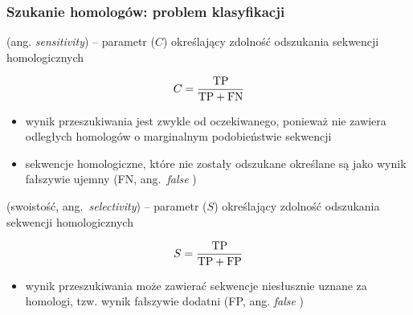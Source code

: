 \begin{frame}
\frametitle{Szukanie homologów: problem klasyfikacji}

\raggedright\tiny
\begin{multicols}{2}

  (ang. \emph{sensitivity}) -- parametr ($C$) określający
 zdolność odszukania  sekwencji homologicznych

\vspace{-2ex}

\[ C = \frac{\rm{TP}}{\rm{TP} + \rm{FN}} \]

 \begin{itemize}

 \item wynik przeszukiwania jest zwykle  od
 oczekiwanego, ponieważ nie zawiera odległych homologów o marginalnym
 podobieństwie sekwencji

 \item sekwencje homologiczne, które nie zostały odszukane określane
 są jako wynik fałszywie ujemny (FN, ang.\ \emph{false
 }) 

 \end{itemize}

  (swoistość, ang.\ \emph{selectivity}) -- parametr
 ($S$) określający zdolność odszukania  sekwencji
 homologicznych

\vspace{-2ex}

\[ S = \frac{\rm{TP}}{\rm{TP} + \rm{FP}} \]

 \begin{itemize}

 \item wynik przeszukiwania może zawierać  sekwencje
 niesłusznie uznane za homologi, tzw. wynik fałszywie dodatni
 (FP, ang. \emph{false })

 \end{itemize}



\end{multicols}
\end{frame}
